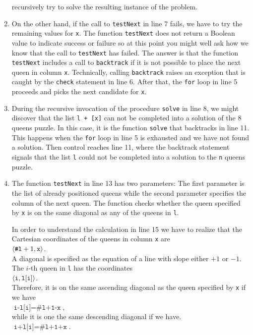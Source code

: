 \begin{enumerate}
      recursively try to solve the resulting instance of the problem.
\item On the other hand, if the call to \texttt{testNext} in line 7 fails, we have to try
      the remaining values for \texttt{x}.   The function \texttt{testNext} does not return a 
      Boolean value to indicate success or failure so at this point you might well
      ask how we know that the call to \texttt{testNext} has failed.  The answer is that the function
      \texttt{testNext} includes a call to \texttt{backtrack} if it is not possible to
      place the next queen in column \texttt{x}.  Technically, calling \texttt{backtrack}
      raises an exception that is caught by the \texttt{check} statement in line 6.
      After that,  the \texttt{for} loop in line 5 proceeds and picks the next
      candidate for \texttt{x}.
\item During the recursive invocation of the procedure \texttt{solve} in line 8, we might
      discover that the list \texttt{l + [x]} can not be completed into a solution of the 8
      queens puzzle.   In this case, it is the function \texttt{solve} that backtracks
      in line 11.  This happens when the \texttt{for} loop in line 5 is exhausted and we
      have not found a solution.  Then
      control  reaches line 11, where the backtrack statement  signals that the list \texttt{l}
      could not be completed into a solution to the \texttt{n} queens puzzle.
\item The function \texttt{testNext} in line 13 has two parameters:  The first parameter is the list
      of already positioned queens while the second parameter specifies the column of the next
      queen.  The function checks whether the queen specified by \texttt{x} is on the same
      diagonal as any of the queens in \texttt{l}.
      
      In order to understand the calculation in line 15 we have to realize that the
      Cartesian coordinates of the queens in column \texttt{x} are 
      \\[0.2cm]
      \hspace*{1.3cm}
      $\pair(\texttt{\#l}+1, \mathtt{x})$.
      \\[0.2cm]
      A diagonal is specified as the equation of a line with slope either $+1$ or $-1$.
      The $i$-th  queen in \texttt{l} has the coordinates
      \\[0.2cm]
      \hspace*{1.3cm}
      $\pair(\texttt{i}, \mathtt{l[i]})$.      
      \\[0.2cm]
      Therefore, it is on the same ascending diagonal as the queen specified by \texttt{x} if
      we have
      \\[0.2cm]
      \hspace*{1.3cm}
      $\texttt{i-l[i]} = \texttt{\#l+1-x}$,
      \\[0.2cm]
      while it is one the same descending diagonal if we have.
      \\[0.2cm]
      \hspace*{1.3cm}
      $\texttt{i+l[i]} = \texttt{\#l+1+x}$.
\end{enumerate}

